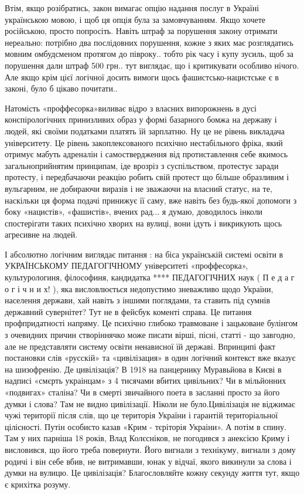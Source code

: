 \documentclass[a4paper,11pt]{extreport}
\begin{document}
\begin{itemize}
Втім, якщо розібратись, закон вимагає опцію надання послуг в Україні українською мовою, і щоб ця опція була за замовчуванням. Якщо хочете російською, просто попросіть.
Навіть штраф за порушення закону отримати нереально: потрібно два послідовних порушення, кожне з яких має розглядатись мовним омбудсменом протягом до півроку.. тобто рік часу і купу зусиль, щоб за порушення дали штраф 500 грн.. тут виглядає, що і критикувати особливо нічого.
Але якщо крім цієї логічної досить вимоги щось фашистсько-нацистське є в законі, було б цікаво почитати..

Натомість «проффесорка»виливає відро з власних випорожнень в дусі конспірологічних принизливих образ у формі базарного бомжа на державу і людей, які своїми податками платять їй зарплатню. Ну це не рівень викладача університету. Це рівень закоплексованого психічно нестабільного фріка, який отримує мабуть адреналін і самоствердження від протиставлення себе якимось загальноприйнятим принципам, іде врозріз з суспільством, протестує заради протесту, і передбачаючи реакцію робить свій протест що більше образливим і вульгарним, не добираючи виразів і не зважаючи на власний статус, на те, наскільки ця форма подачі принижує її саму, вже навіть без будь-якої допомоги з боку «нацистів», «фашистів», вчених рад... я думаю, доводилось інколи спостерігати таких психічно хворих на вулиці, вони ідуть і викрикують щось агресивне на людей.

І абсолютно логічним виглядає питання : на біса українській системі освіти в УКРАЇНСЬКОМУ ПЕДАГОГІЧНОМУ університеті «проффесорка», культурологиня, філософиня, кандидатка **** ПЕДАГОГІЧНИХ наук ( П е д а г о г і ч н и х! ), яка висловлюється недопустимо зневажливо щодо України, населення держави, хай навіть з іншими поглядами, та ставить під сумнів державний сувернітет? Тут не в фейсбук коменті справа. Це питання профпридатності напряму.
Це психічно глибоко травмоване і зацьковане булінгом з очевидних причин створіннячко може писати вірші, пісні, статті - що завгодно, але не представляти систему освіти ненависної їй державі.
Впринципі факт постановки слів «русскій» та «цивілізация» в один логічний контекст вже вказує на шизофренію. Де цивілізація? В 1918 на панцернику Муравьйова в Києві в надписі «смєрть украінцам» з 4 тисячами вбитих цивільних? Чи в мільйонних «подвигах» сталіна? Чи в смерті звичайного поета в засланні просто за його думки і слова? Там не видно цивілізації. Ніколи не було.Цивілізація не віджимає чужі території після слів, що це територія України і гарантій територіальної цілісності. Путін особисто казав «Крим - тєріторія Украіни». А потім в спину.
Там у них парніша 18 років, Влад Колєсніков, не погодився з анексією Криму і висловився, що його треба повернути. Його вигнали з технікуму, вигнали з дому родичі і він себе вбив, не витримавши, юнак у відчаї, якого викинули за слова і думки на вулицю. Це цивілізація?
Благословляйте кожну секунду життя тут, якщо є крихітка розуму.


\end{itemize}
\end{document}
